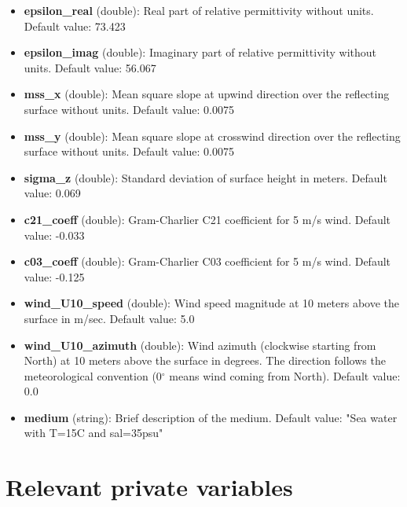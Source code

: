 \begin{itemize}
\item {\bf epsilon\_real} (double): Real part of relative permittivity without units. Default value: 73.423

\item {\bf epsilon\_imag} (double): Imaginary part of relative permittivity without units. Default value: 56.067

\item {\bf mss\_x} (double): Mean square slope at upwind direction over the reflecting surface without units. Default value: 0.0075

\item {\bf mss\_y} (double): Mean square slope at crosswind direction over the reflecting surface without units. Default value: 0.0075

\item {\bf sigma\_z} (double): Standard deviation of surface height in meters. Default value: 0.069

\item {\bf c21\_coeff} (double): Gram-Charlier C21 coefficient for 5 m/s wind. Default value: -0.033

\item {\bf c03\_coeff} (double): Gram-Charlier C03 coefficient for 5 m/s wind. Default value: -0.125

\item {\bf wind\_U10\_speed} (double): Wind speed magnitude at 10 meters above the surface in m/sec. Default value: 5.0 

\item {\bf wind\_U10\_azimuth} (double): Wind azimuth (clockwise starting from North) at 10 meters above the surface in degrees. The direction follows the meteorological convention (0$^\circ$ means wind coming from North). Default value: 0.0

\item {\bf medium} (string): Brief description of the medium. Default value: "Sea water with T=15C and sal=35psu"
\end{itemize}


\section{Relevant private variables}

